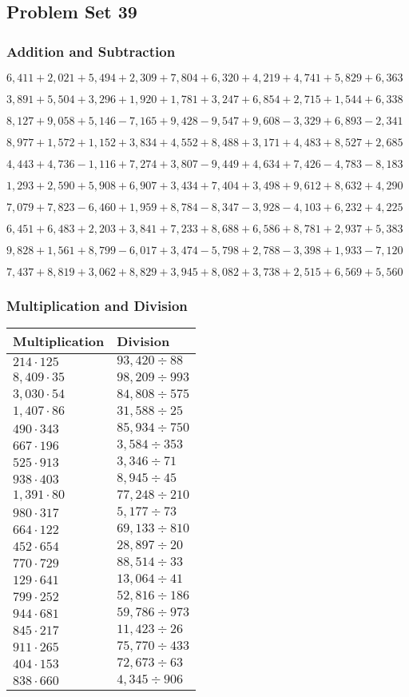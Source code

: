 \hypertarget{problem-set-39-3}{%
\subsection{Problem Set 39}\label{problem-set-39-3}}

\hypertarget{addition-and-subtraction-201}{%
\subsubsection{Addition and
Subtraction}\label{addition-and-subtraction-201}}

\(6,411+2,021+5,494+2,309+7,804+6,320+4,219+4,741+5,829+ 6,363\)

\(3,891+5,504+3,296+1,920+1,781+3,247+6,854+2,715+1,544+6,338\)

\(8,127+9,058+5,146-7,165+9,428-9,547+9,608-3,329+6,893-2,341\)

\(8,977+1,572+1,152+3,834+4,552+8,488+3,171+4,483+8,527+2,685\)

\(4,443+4,736-1,116+7,274+3,807-9,449+4,634+7,426-4,783-8,183\)

\(1,293+2,590+5,908+6,907+3,434+7,404+3,498+9,612+8,632+4,290\)

\(7,079+7,823-6,460+1,959+8,784-8,347-3,928-4,103+6,232+4,225\)

\(6,451+6,483+2,203+3,841+7,233+8,688+6,586+8,781+2,937+5,383\)

\(9,828+1,561+8,799-6,017+3,474-5,798+2,788-3,398+1,933-7,120\)

\(7,437+8,819+3,062+8,829+3,945+8,082+3,738+2,515+6,569+5,560\)

\hypertarget{multiplication-and-division-200}{%
\subsubsection{Multiplication and
Division}\label{multiplication-and-division-200}}

\begin{longtable}[]{@{}ll@{}}
\toprule
Multiplication & Division\tabularnewline
\midrule
\endhead
\(214\cdot125\) & \(93,420÷88\)\tabularnewline
\(8,409\cdot35\) & \(98,209÷993\)\tabularnewline
\(3,030\cdot54\) & \(84,808÷575\)\tabularnewline
\(1,407\cdot86\) & \(31,588÷25\)\tabularnewline
\(490\cdot343\) & \(85,934÷750\)\tabularnewline
\(667\cdot196\) & \(3,584÷353\)\tabularnewline
\(525\cdot913\) & \(3,346÷71\)\tabularnewline
\(938\cdot403\) & \(8,945÷45\)\tabularnewline
\(1,391\cdot80\) & \(77,248÷210\)\tabularnewline
\(980\cdot317\) & \(5,177÷73\)\tabularnewline
\(664\cdot122\) & \(69,133÷810\)\tabularnewline
\(452\cdot654\) & \(28,897÷20\)\tabularnewline
\(770\cdot729\) & \(88,514÷33\)\tabularnewline
\(129\cdot641\) & \(13,064÷41\)\tabularnewline
\(799\cdot252\) & \(52,816÷186\)\tabularnewline
\(944\cdot681\) & \(59,786÷973\)\tabularnewline
\(845\cdot217\) & \(11,423÷26\)\tabularnewline
\(911\cdot265\) & \(75,770÷433\)\tabularnewline
\(404\cdot153\) & \(72,673÷63\)\tabularnewline
\(838\cdot660\) & \(4,345÷906\)\tabularnewline
\bottomrule
\end{longtable}

